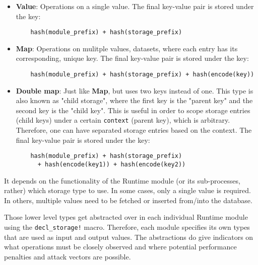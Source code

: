 \documentclass[11pt,a4paper]{article}
\begin{document}
\begin{itemize}
  \item \textbf{Value}: Operations on a single value. \newline\newline
  The final key-value pair is stored under the key:\newline
  \begin{verbatim}
    hash(module_prefix) + hash(storage_prefix)
  \end{verbatim}
  \item \textbf{Map}: Operations on mulitple values, datasets, where each entry
  has its corresponding, unique key. \newline\newline
  The final key-value pair is stored under the key:\newline
  \begin{verbatim}
    hash(module_prefix) + hash(storage_prefix) + hash(encode(key))
  \end{verbatim}
  \newpage
  \item \textbf{Double map}: Just like \textbf{Map}, but uses two keys instead
  of one. This type is also known as "child storage", where the first key is the
  "parent key" and the second key is the "child key". This is useful in order to
  scope storage entries (child keys) under a certain \verb|context| (parent
  key), which is arbitrary. Therefore, one can have separated storage entries
  based on the context.
  \newline\newline
  The final key-value pair is stored under the key:\newline
  \begin{verbatim}
    hash(module_prefix) + hash(storage_prefix)
      + hash(encode(key1)) + hash(encode(key2))
  \end{verbatim}
\end{itemize}

It depends on the functionality of the Runtime module (or its sub-processes,
rather) which storage type to use. In some cases, only a single value is
required. In others, multiple values need to be fetched or inserted from/into
the database.
\newline

Those lower level types get abstracted over in each individual Runtime module
using the \verb|decl_storage!| macro. Therefore, each module specifies its own
types that are used as input and output values. The abstractions do give
indicators on what operations must be closely observed and where potential
performance penalties and attack vectors are possible.
\end{document}
